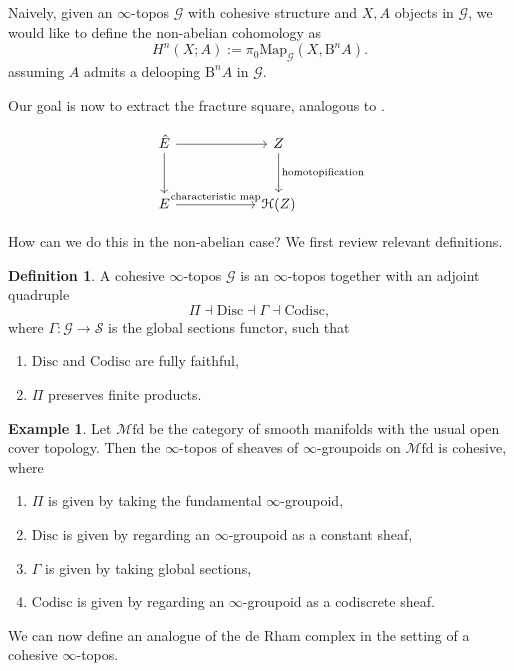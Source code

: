 \documentclass[a4paper]{book}
\newcommand{\lG}{\mathcal{G}}
\newcommand{\lH}{\mathcal{H}}
\newcommand{\lM}{\mathcal{M}}
\newcommand{\lS}{\mathcal{S}}
\newcommand{\Mfd}{\lM\mathrm{fd}} %
\theoremstyle{definition}
\newtheorem{definition}[equation]{Definition}
\newtheorem{example}[equation]{Example}
\theoremstyle{remark}
\numberwithin{equation}{section}
\begin{document}
Naively, given an $\infty$-topos $\lG$ with cohesive structure and $X,A$ objects in $\lG$, we would like to define the non-abelian cohomology as 
\[ H^n(X; A) := \pi_0 \mathrm{Map}_{\lG}(X, \mathrm{B}^n A). \]
assuming $A$ admits a delooping $\mathrm{B}^n A$ in $\lG$.

Our goal is now to extract the fracture square, analogous to \cite{bunkenikolausvoelkl2016diffcoh}. 

\[
\begin{tikzcd}[row sep=1cm, column sep=2cm]
 \hat{E} \arrow[r] \arrow[d] & Z \arrow[d, "\text{homotopification}"] \\ 
	E \arrow[r, "\text{characteristic map}"] & \lH(Z)
\end{tikzcd} 
\]

How can we do this in the non-abelian case? We first review relevant definitions.

\begin{definition}
 A cohesive	$\infty$-topos $\lG$ is an $\infty$-topos together with an adjoint quadruple
	\[	\Pi \dashv \mathrm{Disc} \dashv \Gamma \dashv \mathrm{Codisc},	\]
	where $\Gamma\colon \lG \to \lS$ is the global sections functor,	such that
	\begin{enumerate}
		\item $\mathrm{Disc}$ and $\mathrm{Codisc}$ are fully faithful,
		\item $\Pi$ preserves finite products.
	\end{enumerate}
\end{definition}

\begin{example}
	Let $\Mfd$ be the category of smooth manifolds with the usual open cover topology. Then the $\infty$-topos of sheaves of $\infty$-groupoids on $\Mfd$ is cohesive, where
	\begin{enumerate}
		\item $\Pi$ is given by taking the fundamental $\infty$-groupoid,
		\item $\mathrm{Disc}$ is given by regarding an $\infty$-groupoid as a constant sheaf,
		\item $\Gamma$ is given by taking global sections,
		\item $\mathrm{Codisc}$ is given by regarding an $\infty$-groupoid as a codiscrete sheaf.
	\end{enumerate}
\end{example}

We can now define an analogue of the de Rham complex in the setting of a cohesive $\infty$-topos.
\end{document}
